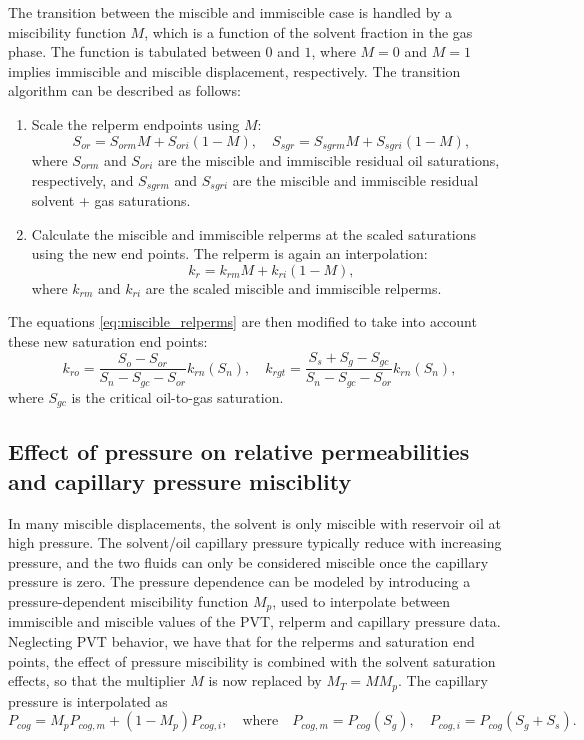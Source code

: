 \documentclass[11pt, a4paper]{article}
\begin{document}
The transition between the miscible and immiscible case is handled by a miscibility function $M$,
which is a function of the solvent fraction in the gas phase. The function is tabulated between $0$
and $1$, where $M = 0$ and $M = 1$ implies immiscible and miscible displacement, respectively. The
transition algorithm can be described as follows:
\begin{enumerate}[label=\emph{(\roman*)}]
\item Scale the relperm endpoints using $M$:
  \begin{equation*}
    S_{or} = S_{orm}M + S_{ori}(1-M), \quad S_{sgr} = S_{sgrm}M + S_{sgri}(1-M),
  \end{equation*}
  where $S_{orm}$ and $S_{ori}$ are the miscible and immiscible residual oil saturations,
  respectively, and $S_{sgrm}$ and $S_{sgri}$ are the miscible and immiscible residual solvent + gas
  saturations.
\item Calculate the miscible and immiscible relperms at the scaled saturations using the new end
  points. The relperm is again an interpolation:
  \begin{equation*}
    k_r = k_{rm}M + k_{ri}(1-M),
  \end{equation*}
  where $k_{rm}$ and $k_{ri}$ are the scaled miscible and immiscible relperms.
\end{enumerate}
The equations \eqref{eq:miscible_relperms} are then modified to take into account these new
saturation end points:
\begin{equation*}
  k_{ro} = \frac{S_o - S_{or}}{S_n - S_{gc} - S_{or}}k_{rn}(S_n), \quad k_{rgt} = \frac{S_s + S_g - S_{gc}}{S_n - S_{gc} - S_{or}}k_{rn}(S_n),
\end{equation*}
where $S_{gc}$ is the critical oil-to-gas saturation.

\subsection*{Effect of pressure on relative permeabilities and capillary pressure misciblity}

In many miscible displacements, the solvent is only miscible with reservoir oil at high
pressure. The solvent/oil capillary pressure typically reduce with increasing pressure, and the two
fluids can only be considered miscible once the capillary pressure is zero. The pressure dependence
can be modeled by introducing a pressure-dependent miscibility function $M_p$, used to interpolate
between immiscible and miscible values of the PVT, relperm and capillary pressure data. Neglecting
PVT behavior, we have that for the relperms and saturation end points, the effect of pressure
miscibility is combined with the solvent saturation effects, so that the multiplier $M$ is now
replaced by $M_T = MM_p$. The capillary pressure is interpolated as
\begin{equation*}
  P_{cog} = M_p P_{cog,m} + (1-M_p)P_{cog,i}, \quad \text{where} \quad P_{cog,m} = P_{cog}(S_g), \quad P_{cog,i} = P_{cog}(S_g + S_s).
\end{equation*}
\end{document}
